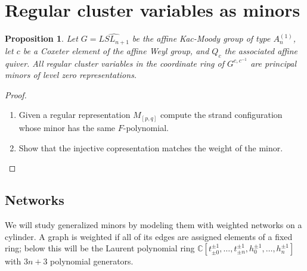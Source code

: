 \documentclass[12pt]{amsart}
\newcommand{\CC}{\mathbb{C}}
\newtheorem{proposition}[theorem]{Proposition}
\numberwithin{equation}{section}
\begin{document}
\section{Regular cluster variables as minors}

\begin{proposition}\label{prop:level zero}
Let $G = \widehat{LSL_{n+1}}$ be the affine Kac-Moody group of type $A_n^{(1)}$, let $c$ be a Coxeter element of the affine Weyl group, and $Q_c$ the associated affine quiver.  All regular cluster variables in the coordinate ring of $G^{c,c^{-1}}$ are principal minors of level zero representations.  
\end{proposition}
\begin{proof}
\begin{enumerate}
\item Given a regular representation $M_{[p,q]}$ compute the strand configuration whose minor has the same $F$-polynomial.
\item Show that the injective copresentation matches the weight of the minor.
\end{enumerate}
\end{proof}

\subsection{Networks}

We will study generalized minors by modeling them with weighted networks on a cylinder. A graph is weighted if all of its edges are assigned elements of a fixed ring; below this will be the Laurent polynomial ring $\CC[t_{\pm0}^{\pm1},\dotsc,t_{\pm n}^{\pm1},h_0^{\pm1},\dotsc,h_n^{\pm1}]$ with $3n+3$ polynomial generators.
\end{document}
